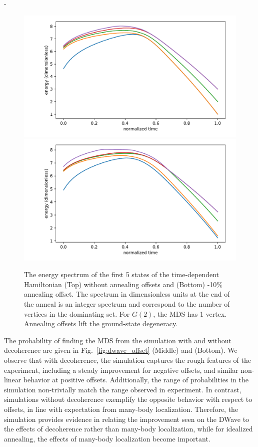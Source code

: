 -\documentclass[prd,twocolumn,tightenlines,preprintnumbers,showpacs,superscriptaddress,notitlepage,nofootinbib,eqsecnum,floatfix,longbibliography]{revtex4}
\begin{document}
\begin{figure}
    \centering
    \includegraphics[width=\columnwidth]{./figures/spectrum.pdf}
    \includegraphics[width=\columnwidth]{./figures/spectrum_offset.pdf}
    \caption{The energy spectrum of the first 5 states of the time-dependent Hamiltonian (Top) without annealing offsets and (Bottom) -10\% annealing offset.
The spectrum in dimensionless units at the end of the anneal is an integer spectrum and correspond to the number of vertices in the dominating set.
For $G(2)$, the MDS has 1 vertex.
Annealing offsets lift the ground-state degeneracy.}
    \label{fig:spectrum}
\end{figure}

The probability of finding the MDS from the simulation with and without decoherence are given in Fig.~\ref{fig:dwave_offset} (Middle) and (Bottom).
We observe that with decoherence, the simulation captures the rough features of the experiment, including a steady improvement for negative offsets, and similar non-linear behavior at positive offsets.
Additionally, the range of probabilities in the simulation non-trivially match the range observed in experiment.
In contrast, simulations without decoherence exemplify the opposite behavior with respect to offsets, in line with expectation from many-body localization.
Therefore, the simulation provides evidence in relating the improvement seen on the DWave to the effects of decoherence rather than many-body localization, while for idealized annealing, the effects of many-body localization become important.
\end{document}
